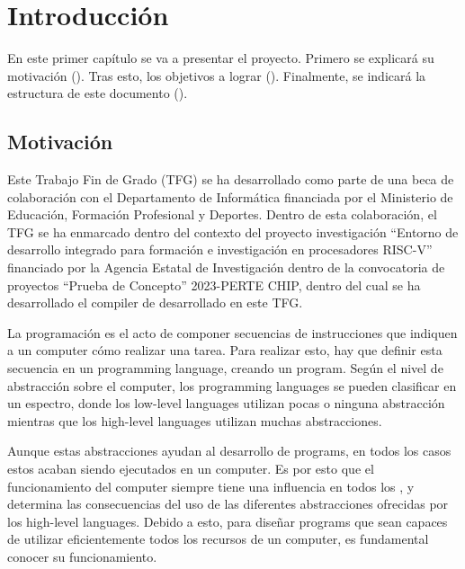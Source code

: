 \chapter{Introducción}\label{chap:introduction}

En este primer capítulo se va a presentar el proyecto. Primero se explicará su
motivación (). Tras esto, los objetivos a
lograr (). Finalmente, se indicará la estructura de este
documento ().

\section{Motivación}\label{sec:motivation}

Este Trabajo Fin de Grado (TFG) se ha desarrollado como parte de una beca de
colaboración con el Departamento de Informática financiada por el Ministerio de
Educación, Formación Profesional y Deportes. Dentro de esta colaboración, el TFG
se ha enmarcado dentro del contexto del proyecto investigación ``Entorno de
desarrollo integrado para formación e investigación en procesadores RISC-V''
financiado por la Agencia Estatal de Investigación dentro de la convocatoria de
proyectos ``Prueba de Concepto'' 2023-PERTE CHIP, dentro del cual se ha
desarrollado el \gls{compiler} de  desarrollado
en este TFG.

La programación es el acto de componer secuencias de instrucciones que indiquen
a un \gls{computer} cómo realizar una tarea. Para realizar esto, hay que definir
esta secuencia en un \gls{programming language}, creando un \gls{program}. Según
el nivel de abstracción sobre el \gls{computer}, los \glspl{programming language} se
pueden clasificar en un espectro, donde los \glspl{low-level language} utilizan
pocas o ninguna abstracción mientras que los \glspl{high-level language}
utilizan muchas abstracciones.

Aunque estas abstracciones ayudan al desarrollo de \glspl{program}, en todos los
casos estos acaban siendo ejecutados en un \gls{computer}. Es por esto que el
funcionamiento del \gls{computer} siempre tiene una influencia en todos los
, y determina las consecuencias del uso
de las diferentes abstracciones ofrecidas por los \glspl{high-level language}.
Debido a esto, para diseñar \glspl{program} que sean capaces de utilizar
eficientemente todos los recursos de un \gls{computer}, es fundamental conocer
su funcionamiento.

